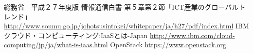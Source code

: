 \documentclass[mingoth]{kut-paper}		%
\begin{document}

\begin{thebibliography}{99}
%
総務省　平成２７年度版 情報通信白書 第５章第２節「ICT産業のグローバルトレンド」 				\url{http://www.soumu.go.jp/johotsusintokei/whitepaper/ja/h27/pdf/index.html}
IBMクラウド・コンピューティング:IaaSとは-Japan
\url{http://www.ibm.com/cloud-computing/jp/ja/what-is-iaas.html}
OpenStack
\url{https://www.openstack.org}
\end{thebibliography}


\appendix

\chapter{}
%

\chapter{}
%
\end{document}
